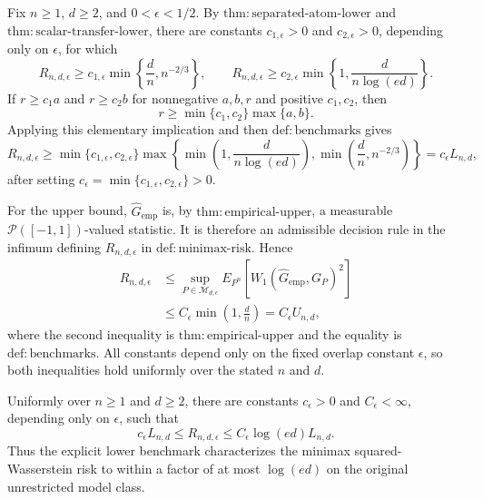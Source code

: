 Fix \(n\geq 1\), \(d\geq 2\), and \(0<\epsilon<1/2\).  By \(\mathrm{thm:separated\mbox{-}atom\mbox{-}lower}\) and \(\mathrm{thm:scalar\mbox{-}transfer\mbox{-}lower}\), there are constants \(c_{1,\epsilon}>0\) and \(c_{2,\epsilon}>0\), depending only on \(\epsilon\), for which
\[
 R_{n,d,\epsilon}\geq c_{1,\epsilon}\min\!\left\{\frac dn,n^{-2/3}\right\},
 \qquad
 R_{n,d,\epsilon}\geq c_{2,\epsilon}\min\!\left\{1,\frac{d}{n\log(ed)}\right\}.
\]
If \(r\geq c_1 a\) and \(r\geq c_2 b\) for nonnegative \(a,b,r\) and positive \(c_1,c_2\), then
\[
 r\geq \min\{c_1,c_2\}\max\{a,b\}.
\]
Applying this elementary implication and then \(\mathrm{def:benchmarks}\) gives
\[
 R_{n,d,\epsilon}\geq
 \min\{c_{1,\epsilon},c_{2,\epsilon}\}
 \max\!\left\{
   \min\!\left(1,\frac{d}{n\log(ed)}\right),
   \min\!\left(\frac dn,n^{-2/3}\right)
 \right\}
 =c_\epsilon L_{n,d},
\]
after setting \(c_\epsilon=\min\{c_{1,\epsilon},c_{2,\epsilon}\}>0\).

For the upper bound, \(\widehat G_{\mathrm{emp}}\) is, by \(\mathrm{thm:empirical\mbox{-}upper}\), a measurable \(\mathcal P([-1,1])\)-valued statistic.  It is therefore an admissible decision rule in the infimum defining \(R_{n,d,\epsilon}\) in \(\mathrm{def:minimax\mbox{-}risk}\).  Hence
\[
 \begin{aligned}
 R_{n,d,\epsilon}
 &\leq \sup_{P\in\mathcal M_{d,\epsilon}}
 E_{P^n}\!\left[W_1(\widehat G_{\mathrm{emp}},G_P)^2\right] \\
 &\leq C_\epsilon\min\!\left(1,\frac dn\right)
 =C_\epsilon U_{n,d},
 \end{aligned}
\]
where the second inequality is \(\mathrm{thm:empirical\mbox{-}upper}\) and the equality is \(\mathrm{def:benchmarks}\).  All constants depend only on the fixed overlap constant \(\epsilon\), so both inequalities hold uniformly over the stated \(n\) and \(d\).

Uniformly over \(n\geq1\) and \(d\geq2\), there are constants \(c_\epsilon>0\) and \(C_\epsilon<\infty\), depending only on \(\epsilon\), such that
\[
 c_\epsilon L_{n,d}\leq R_{n,d,\epsilon}
 \leq C_\epsilon\log(ed)L_{n,d}.
\]
Thus the explicit lower benchmark characterizes the minimax squared-Wasserstein risk to within a factor of at most \(\log(ed)\) on the original unrestricted model class.

